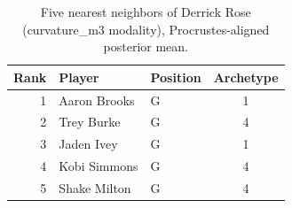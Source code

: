 \begin{table}[htbp]
  \centering\small
  \begin{tabular}{rllc}
    \toprule
    Rank & Player & Position & Archetype \\
    \midrule
    1 & Aaron Brooks & G & 1 \\
    2 & Trey Burke & G & 4 \\
    3 & Jaden Ivey & G & 1 \\
    4 & Kobi Simmons & G & 4 \\
    5 & Shake Milton & G & 4 \\
    \bottomrule
  \end{tabular}
  \caption{Five nearest neighbors of Derrick Rose (curvature_m3 modality), Procrustes-aligned posterior mean.}
  \label{tab:Derrick_Rose_neighbors_curvature_m3}
\end{table}

